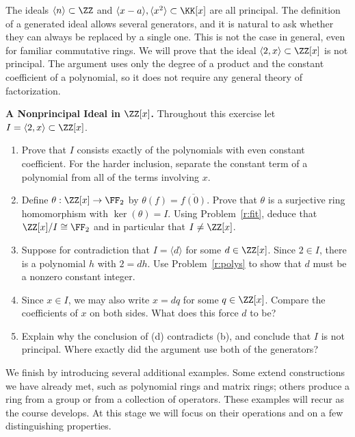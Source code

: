\documentclass[12pt,reqno]{amsart}
\begin{document}
\hrulefill
 
 
The ideals $\langle n\rangle\subset\ZZ$ and $\langle x-a\rangle,\langle x^2\rangle\subset\KK[x]$ are all principal. The definition of a generated ideal allows several generators, and it is natural to ask whether they can always be replaced by a single one. This is not the case in general, even for familiar commutative rings. We will prove that the ideal $\langle 2,x\rangle\subset\ZZ[x]$ is not principal. The argument uses only the degree of a product and the constant coefficient of a polynomial, so it does not require any general theory of factorization.
 
\hrulefill
 
\begin{problems}
\item\label{r:nonprincipal} \textbf{A Nonprincipal Ideal in $\ZZ[x]$.} Throughout this exercise let $I=\langle 2,x\rangle\subset\ZZ[x]$.
\begin{enumerate}
\item Prove that $I$ consists exactly of the polynomials with even constant coefficient. For the harder inclusion, separate the constant term of a polynomial from all of the terms involving $x$.
\item Define $\theta:\ZZ[x]\to\FF_2$ by $\theta(f)=\overline{f(0)}$. Prove that $\theta$ is a surjective ring homomorphism with $\ker(\theta)=I$. Using Problem~\ref{r:fit}, deduce that $\ZZ[x]/I\cong\FF_2$ and in particular that $I\ne\ZZ[x]$.
\item Suppose for contradiction that $I=\langle d\rangle$ for some $d\in\ZZ[x]$. Since $2\in I$, there is a polynomial $h$ with $2=dh$. Use Problem~\ref{r:polys} to show that $d$ must be a nonzero constant integer.
\item Since $x\in I$, we may also write $x=dq$ for some $q\in\ZZ[x]$. Compare the coefficients of $x$ on both sides. What does this force $d$ to be?
\item Explain why the conclusion of (d) contradicts (b), and conclude that $I$ is not principal. Where exactly did the argument use both of the generators?
\end{enumerate}
\end{problems}
 
\hrulefill
 
 We finish by introducing several additional examples. Some extend constructions we have already met, such as polynomial rings and matrix rings; others produce a ring from a group or from a collection of operators. These examples will recur as the course develops. At this stage we will focus on their operations and on a few distinguishing properties.
 
\end{document}
